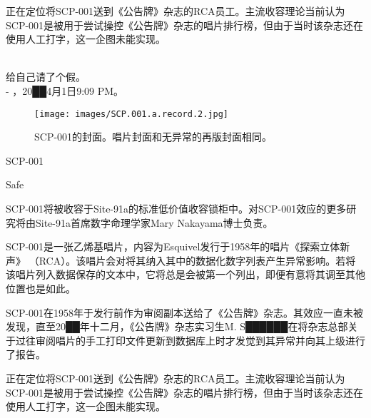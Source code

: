 正在定位将SCP-001送到《公告牌》杂志的RCA员工。主流收容理论当前认为SCP-001是被用于尝试操控《公告牌》杂志的唱片排行榜，但由于当时该杂志还在使用人工打字，这一企图未能实现。


\newpage



\begin{scpbox}
 \\
给自己请了个假。 \\
- ，20██4月1日9:09 PM。
\end{scpbox}

\begin{figure}[H]
	\centering
	\texttt{[image: images/SCP.001.a.record.2.jpg]}
	\caption*{SCP-001的封面。唱片封面和无异常的再版封面相同。}
\end{figure}

SCP-001

Safe

SCP-001将被收容于Site-91a的标准低价值收容锁柜中。对SCP-001效应的更多研究将由Site-91a首席数字命理学家Mary Nakayama博士负责。

SCP-001是一张乙烯基唱片，内容为Esquivel发行于1958年的唱片《探索立体新声》 （RCA）。该唱片会对将其纳入其中的数据化数字列表产生异常影响。若将该唱片列入数据保存的文本中，它将总是会被第一个列出，即便有意将其调至其他位置也是如此。

SCP-001在1958年于发行前作为审阅副本送给了《公告牌》杂志。其效应一直未被发现，直至20██年十二月，《公告牌》杂志实习生M. S██████在将杂志总部关于过往审阅唱片的手工打印文件更新到数据库上时才发觉到其异常并向其上级进行了报告。

正在定位将SCP-001送到《公告牌》杂志的RCA员工。主流收容理论当前认为SCP-001是被用于尝试操控《公告牌》杂志的唱片排行榜，但由于当时该杂志还在使用人工打字，这一企图未能实现。


\newpage


